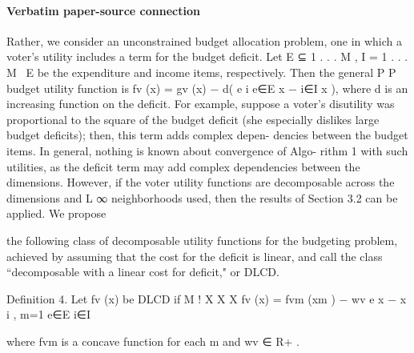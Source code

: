 \documentclass[10pt]{article}
\begin{document}
\paragraph{Verbatim paper-source connection}
\begin{ReviewVerbatim}
Rather, we consider an unconstrained budget allocation problem, one in which a voter's
utility includes a term for the budget deficit.             Let E   ⊆ {1 . . . M }, I = {1 . . . M } \ E be
the expenditure and income items, respectively. Then the general
                       P          P                                                    budget utility function is
fv (x) = gv (x) − d(        e              i
                       e∈E x −        i∈I x ), where d is an increasing function on the deficit.
   For example, suppose a voter's disutility was proportional to the                           square of the budget
deficit (she especially dislikes large budget deficits); then, this term adds complex depen-
dencies between the budget items. In general, nothing is known about convergence of Algo-
rithm 1 with such utilities, as the deficit term may add complex dependencies between the
dimensions. However, if the voter utility functions are decomposable across the dimensions
and L
      ∞ neighborhoods used, then the results of Section 3.2 can be applied. We propose

the following class of decomposable utility functions for the budgeting problem, achieved
by assuming that the cost for the deficit is linear, and call the class “decomposable with a
linear cost for deficit," or DLCD.


Definition 4. Let fv (x) be DLCD if
                                      M
                                                                                       !
                                      X                      X           X
                           fv (x) =         fvm (xm ) − wv         e
                                                                   x −         x   i
                                                                                           ,
                                      m=1                    e∈E         i∈I

where fvm is a concave function for each m and wv ∈ R+ .
\end{ReviewVerbatim}
\end{document}
